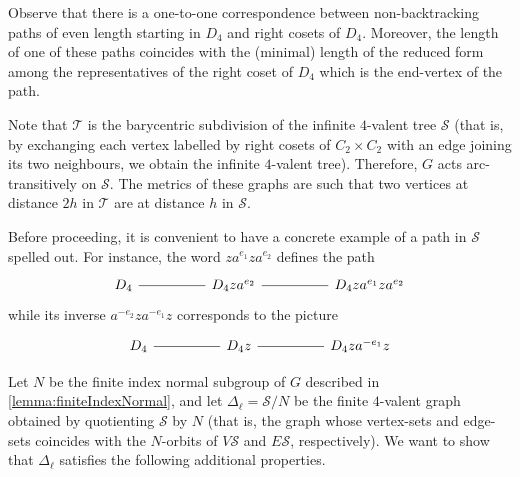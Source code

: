 \documentclass[a4paper]{amsart}
\newcommand{\0}{\mathbf{0}}
\theoremstyle{definition}
\begin{document}
Observe that there is a one-to-one correspondence between non-backtracking paths of even length starting in $D_4$ and right cosets of $D_4$. Moreover, the length of one of these paths coincides with the (minimal) length of the reduced form among the representatives of the right coset of $D_4$ which is the end-vertex of the path. 

Note that $\mathcal{T}$ is the barycentric subdivision of the infinite $4$-valent tree $\mathcal{S}$ (that is, by exchanging each vertex labelled by right cosets of $C_2\times C_2$ with an edge joining its two neighbours, we obtain the infinite $4$-valent tree). Therefore, $G$ acts arc-transitively on $\mathcal{S}$.
The metrics of these graphs are such that two vertices at distance $2h$ in $\mathcal{T}$ are at distance $h$ in $\mathcal{S}$.

Before proceeding, it is convenient to have a concrete example of a path in $\mathcal{S}$ spelled out. For instance, the word $za^{e_1}za^{e_2}$ defines the path
\[\begin{tikzcd}
    D_4 && D_4 za^{e_2} && D_4 za^{e_1}za^{e_2}
    \arrow[no head, from=1-1, to=1-3]
	\arrow[no head, from=1-3, to=1-5]
\end{tikzcd}\]
while its inverse $a^{-e_2}za^{-e_1}z$ corresponds to the picture
\[\begin{tikzcd}
    D_4 && D_4 z && D_4 za^{-e_1}z
    \arrow[no head, from=1-1, to=1-3]
	\arrow[no head, from=1-3, to=1-5]
\end{tikzcd}\]

Let $N$ be the finite index normal subgroup of $G$ described in \cref{lemma:finiteIndexNormal}, and let $\Delta_\ell = \mathcal{S}/N$ be the finite $4$-valent graph obtained by quotienting $\mathcal{S}$ by $N$ (that is, the graph whose vertex-sets and edge-sets coincides with the $N$-orbits of $V\mathcal{S}$ and $E\mathcal{S}$, respectively). We want to show that $\Delta_\ell$ satisfies the following additional properties.
\end{document}
